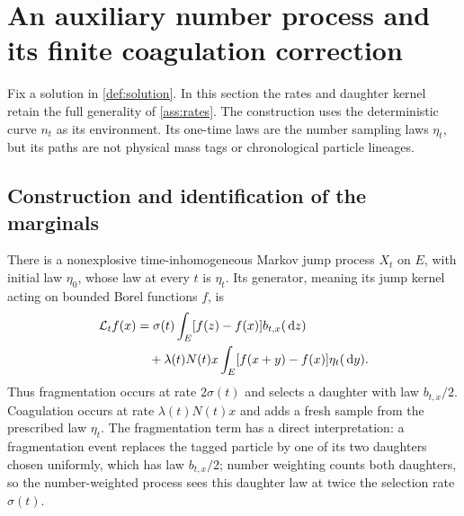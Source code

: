 \section{An auxiliary number process and its finite coagulation correction}
\label{sec:auxiliary}

Fix a solution in \cref{def:solution}. In this section the rates and
daughter kernel retain the full generality of \cref{ass:rates}.
The construction uses the deterministic curve $n_t$ as its environment.
Its one-time laws are the number sampling laws $\eta_t$, but its paths
are not physical mass tags or chronological particle lineages.

\subsection{Construction and identification of the marginals}

\begin{theorem}\label{thm:number-process}
There is a nonexplosive time-inhomogeneous Markov jump process $X_t$
on $E$, with initial law $\eta_0$, whose law at every $t$ is $\eta_t$.
Its generator, meaning its jump kernel acting on bounded Borel
functions $f$, is
\begin{align}
 \mathcal L_t f(x)
 &=\sigma(t)\int_E[f(z)-f(x)]b_{t,x}(\,\mathrm d z)\notag\\
 &\quad+\lambda(t)N(t)x\int_E[f(x+y)-f(x)]\eta_t(\,\mathrm d y).
 \label{eq:number-generator}
\end{align}
Thus fragmentation occurs at rate $2\sigma(t)$ and selects a daughter
with law $b_{t,x}/2$. Coagulation occurs at rate $\lambda(t)N(t)x$
and adds a fresh sample from the prescribed law $\eta_t$.
The fragmentation term has a direct interpretation: a fragmentation
event replaces the tagged particle by one of its two daughters chosen
uniformly, which has law $b_{t,x}/2$; number weighting counts both
daughters, so the number-weighted process sees this daughter law at
twice the selection rate $\sigma(t)$.
\end{theorem}

